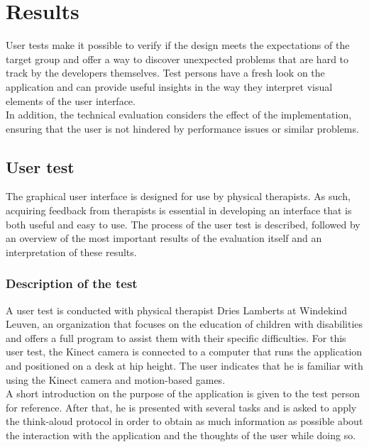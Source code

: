 \chapter{Results}

User tests make it possible to verify if the design meets the expectations of the target group and offer a way to discover unexpected problems that are hard to track by the developers themselves. Test persons have a fresh look on the application and can provide useful insights in the way they interpret visual elements of the user interface.\\

In addition, the technical evaluation considers the effect of the implementation, ensuring that the user is not hindered by performance issues or similar problems.


\section{User test}

The graphical user interface is designed for use by physical therapists. As such, acquiring feedback from therapists is essential in developing an interface that is both useful and easy to use. The process of the user test is described, followed by an overview of the most important results of the evaluation itself and an interpretation of these results.


\subsection{Description of the test}

A user test is conducted with physical therapist Dries Lamberts at Windekind Leuven, an organization that focuses on the education of children with disabilities and offers a full program to assist them with their specific difficulties. For this user test, the Kinect camera is connected to a computer that runs the application and positioned on a desk at hip height. The user indicates that he is familiar with using the Kinect camera and motion-based games.\\

A short introduction on the purpose of the application is given to the test person for reference. After that, he is presented with several tasks and is asked to apply the think-aloud protocol in order to obtain as much information as possible about the interaction with the application and the thoughts of the user while doing so.\\

